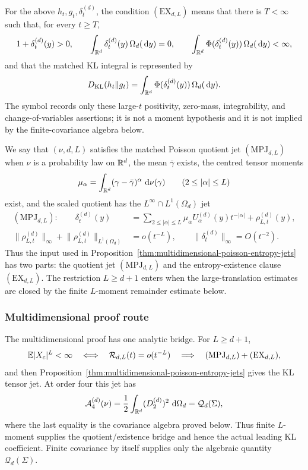\begin{definition}%
\label{def:multidim-ex-dl}
For the above \(h_t,g_t,\delta_t^{(d)}\), the condition
\((\mathrm{EX}_{d,L})\) means that there is \(T<\infty\) such that, for every
\(t\ge T\),
\[
1+\delta_t^{(d)}(y)>0,\qquad
\int_{\mathbb{R}^d}\delta_t^{(d)}(y)\,\Omega_d(\,\mathrm{d} y)=0,\qquad
\int_{\mathbb{R}^d}\Phi(\delta_t^{(d)}(y))\,\Omega_d(\,\mathrm{d} y)<\infty,
\]
and that the matched KL integral is represented by
\[
D_{\rm KL}(h_t\|g_t)
=\int_{\mathbb{R}^d}\Phi(\delta_t^{(d)}(y))\,\Omega_d(\,\mathrm{d} y).
\]
The symbol records only these large-\(t\) positivity, zero-mass,
integrability, and change-of-variables assertions; it is not a moment
hypothesis and it is not implied by the finite-covariance algebra below.
\end{definition}

We say that \((\nu,d,L)\) satisfies the matched Poisson quotient jet
\((\mathrm{MPJ}_{d,L})\) when \(\nu\) is a probability law on \(\mathbb{R}^d\), the
mean \(\bar{\gamma}\) exists, the centred tensor moments
\[
\mu_\alpha=\int_{\mathbb{R}^d}(\gamma-\bar{\gamma})^\alpha\,\,\mathrm{d}\nu(\gamma)
\qquad(2\le|\alpha|\le L)
\]
exist, and the scaled quotient has the \(L^\infty\cap L^1(\Omega_d)\) jet
\begin{equation}\label{eq:mpj-dl-definition}
\begin{aligned}
(\mathrm{MPJ}_{d,L}):\qquad
\delta_t^{(d)}(y)
&=
\sum_{2\le\lvert\alpha\rvert\le L}
\mu_\alpha U_\alpha^{(d)}(y)t^{-\lvert\alpha\rvert}
+\rho_{L,t}^{(d)}(y),\\
\lVert\rho_{L,t}^{(d)}\rVert_\infty+
\lVert\rho_{L,t}^{(d)}\rVert_{L^1(\Omega_d)}
&=o(t^{-L}),\qquad
\lVert\delta_t^{(d)}\rVert_\infty=O(t^{-2}).
\end{aligned}
\end{equation}
Thus the input used in
Proposition~\ref{thm:multidimensional-poisson-entropy-jets} has two parts:
the quotient jet \((\mathrm{MPJ}_{d,L})\) and the entropy-existence clause
\((\mathrm{EX}_{d,L})\).  The restriction \(L\ge d+1\) enters when the
large-translation estimates are closed by the finite \(L\)-moment remainder
estimate below.

\subsubsection*{Multidimensional proof route}\leavevmode\par\smallskip
The multidimensional proof has one analytic bridge.  For \(L\ge d+1\),
\[
\mathbb{E}|X_c|^L<\infty
\quad\Longleftrightarrow\quad
\mathcal R_{d,L}(t)=o(t^{-L})
\quad\Longrightarrow\quad
(\mathrm{MPJ}_{d,L})+(\mathrm{EX}_{d,L}),
\]
and then Proposition~\ref{thm:multidimensional-poisson-entropy-jets} gives the
KL tensor jet.  At order four this jet has
\[
\mathcal A_4^{(d)}(\nu)
=\frac12\int_{\mathbb{R}^d}(D_2^{(d)})^2\,\,\mathrm{d}\Omega_d
=\mathcal Q_d(\Sigma),
\]
where the last equality is the covariance algebra proved below.  Thus finite
\(L\)-moment supplies the quotient/existence bridge and hence the actual
leading KL coefficient.  Finite covariance by itself supplies only the
algebraic quantity \(\mathcal Q_d(\Sigma)\).

